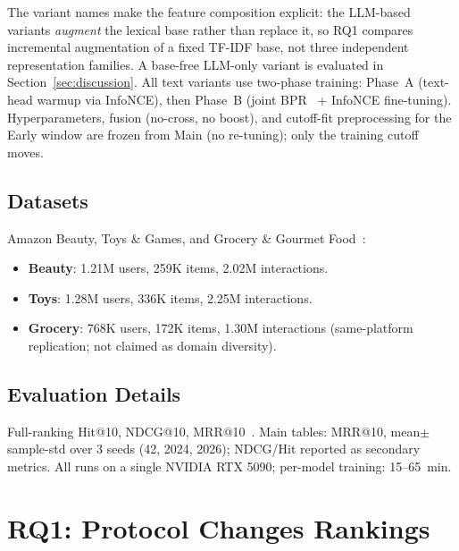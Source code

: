\documentclass[sigconf,natbib=true,anonymous]{acmart}
\newcommand{\tfidf}{\textsc{TF-IDF}\xspace}
\begin{document}
The variant names make the feature composition explicit: the LLM-based variants \emph{augment} the lexical base rather than replace it, so RQ1 compares incremental augmentation of a fixed \tfidf base, not three independent representation families.
A base-free LLM-only variant is evaluated in Section~\ref{sec:discussion}.
All text variants use two-phase training: Phase~A (text-head warmup via InfoNCE), then Phase~B (joint BPR~\cite{rendle2009bpr} + InfoNCE fine-tuning).
Hyperparameters, fusion (no-cross, no boost), and cutoff-fit preprocessing for the Early window are frozen from Main (no re-tuning); only the training cutoff moves.

\subsection{Datasets}

Amazon Beauty, Toys \& Games, and Grocery \& Gourmet Food~\cite{mcauley2015amazon,ni2019amazon}:
\begin{itemize}[leftmargin=*,itemsep=1pt]
\item \textbf{Beauty}: 1.21M users, 259K items, 2.02M interactions.
\item \textbf{Toys}: 1.28M users, 336K items, 2.25M interactions.
\item \textbf{Grocery}: 768K users, 172K items, 1.30M interactions (same-platform replication; not claimed as domain diversity).
\end{itemize}

\subsection{Evaluation Details}

Full-ranking Hit@10, NDCG@10, MRR@10~\cite{krichene2020sampledmetrics}.
Main tables: MRR@10, mean$\pm$sample-std over 3 seeds (42, 2024, 2026); NDCG/Hit reported as secondary metrics.
All runs on a single NVIDIA RTX 5090; per-model training: 15--65~min.

\section{RQ1: Protocol Changes Rankings}
\label{sec:rq1}
\end{document}
